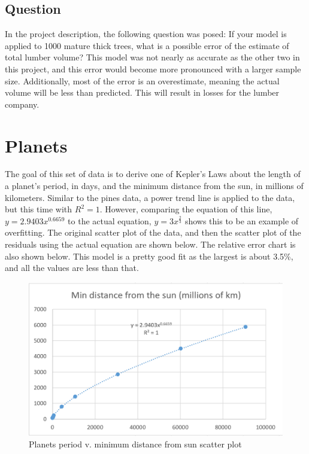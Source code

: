\documentclass[12pt]{extarticle}
\begin{document}
\subsection{Question}
In the project description, the following question was posed: If your model is applied to 1000 mature thick trees, what is a possible error of the estimate of total lumber volume? This model was not nearly as accurate as the other two in this project, and this error would become more pronounced with a larger sample size. Additionally, most of the error is an overestimate, meaning the actual volume will be less than predicted. This will result in losses for the lumber company. 
\section{Planets}
The goal of this set of data is to derive one of Kepler's Laws about the length of a planet's period, in days, and the minimum distance from the sun, in millions of kilometers. Similar to the pines data, a power trend line is applied to the data, but this time with $R^2 = 1$. However, comparing the equation of this line, $y=2.9403x^{0.6659}$ to the actual equation, $y=3x^{\frac{2}{3}}$ shows this to be an example of overfitting. The original scatter plot of the data, and then the scatter plot of the residuals using the actual equation are shown below. The relative error chart is also shown below. This model is a pretty good fit as the largest is about 3.5\%, and all the values are less than that.
\begin{figure}[ht!]
  \includegraphics[width=\linewidth]{PlanetsScatter.PNG}
  \caption{Planets period v. minimum distance from sun scatter plot}
\end{figure}
\end{document}
